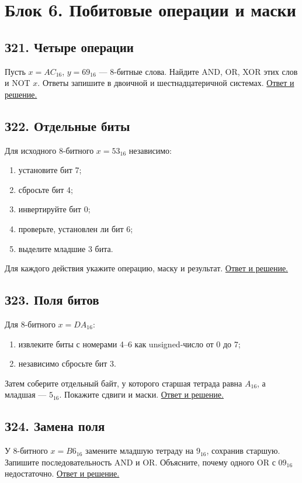 \section{Блок 6. Побитовые операции и маски}
\subsection*{З21. Четыре операции}\label{task:z21}
Пусть $x=AC_{16}$, $y=69_{16}$ --- 8-битные слова. Найдите AND, OR, XOR этих слов и NOT $x$. Ответы запишите в двоичной и шестнадцатеричной системах.
\hyperref[ans:z21]{Ответ и решение.}

\subsection*{З22. Отдельные биты}\label{task:z22}
Для исходного 8-битного $x=53_{16}$ независимо:
\begin{enumerate}
    \item установите бит 7;
    \item сбросьте бит 4;
    \item инвертируйте бит 0;
    \item проверьте, установлен ли бит 6;
    \item выделите младшие 3 бита.
\end{enumerate}
Для каждого действия укажите операцию, маску и результат.
\hyperref[ans:z22]{Ответ и решение.}

\subsection*{З23. Поля битов}\label{task:z23}
Для 8-битного $x=DA_{16}$:
\begin{enumerate}
    \item извлеките биты с номерами 4--6 как unsigned-число от 0 до 7;
    \item независимо сбросьте бит 3.
\end{enumerate}
Затем соберите отдельный байт, у которого старшая тетрада равна $A_{16}$, а младшая --- $5_{16}$. Покажите сдвиги и маски.
\hyperref[ans:z23]{Ответ и решение.}

\subsection*{З24. Замена поля}\label{task:z24}
У 8-битного $x=B6_{16}$ замените младшую тетраду на $9_{16}$, сохранив старшую. Запишите последовательность AND и OR. Объясните, почему одного OR с $09_{16}$ недостаточно.
\hyperref[ans:z24]{Ответ и решение.}

